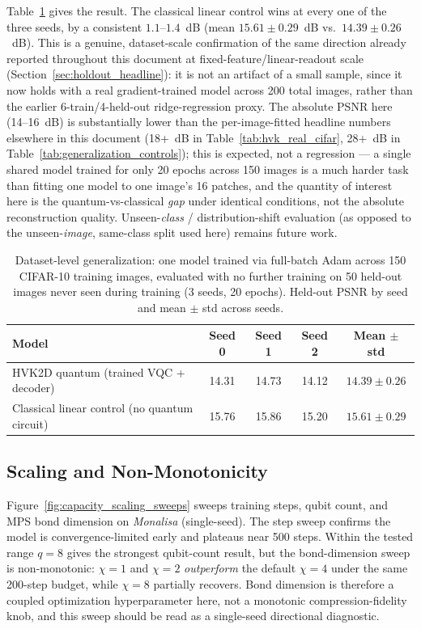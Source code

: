 \documentclass[11pt]{article}
\begin{document}
Table~\ref{tab:dataset_level_generalization} gives the result. The classical linear control wins at every one of the three seeds, by a consistent $1.1$--$1.4$~dB (mean $15.61\pm0.29$~dB vs.\ $14.39\pm0.26$~dB). This is a genuine, dataset-scale confirmation of the same direction already reported throughout this document at fixed-feature/linear-readout scale (Section~\ref{sec:holdout_headline}): it is not an artifact of a small sample, since it now holds with a real gradient-trained model across 200 total images, rather than the earlier 6-train/4-held-out ridge-regression proxy. The absolute PSNR here (14--16~dB) is substantially lower than the per-image-fitted headline numbers elsewhere in this document (18+~dB in Table~\ref{tab:hvk_real_cifar}, 28+~dB in Table~\ref{tab:generalization_controls}); this is expected, not a regression --- a single shared model trained for only 20 epochs across 150 images is a much harder task than fitting one model to one image's 16 patches, and the quantity of interest here is the quantum-vs-classical \emph{gap} under identical conditions, not the absolute reconstruction quality. Unseen-\emph{class} / distribution-shift evaluation (as opposed to the unseen-\emph{image}, same-class split used here) remains future work.

\begin{table}[H]
\centering
\caption{Dataset-level generalization: one model trained via full-batch Adam across 150 CIFAR-10 training images, evaluated with no further training on 50 held-out images never seen during training (3 seeds, 20 epochs). Held-out PSNR by seed and mean $\pm$ std across seeds.}
\label{tab:dataset_level_generalization}
\scriptsize
\begin{tabular}{lcccc}
\toprule
Model & Seed 0 & Seed 1 & Seed 2 & Mean $\pm$ std \\
\midrule
HVK2D quantum (trained VQC + decoder) & 14.31 & 14.73 & 14.12 & $14.39\pm0.26$ \\
Classical linear control (no quantum circuit) & 15.76 & 15.86 & 15.20 & $15.61\pm0.29$ \\
\bottomrule
\end{tabular}
\end{table}

\subsection{Scaling and Non-Monotonicity}
Figure~\ref{fig:capacity_scaling_sweeps} sweeps training steps, qubit count, and MPS bond dimension on \textit{Monalisa} (single-seed). The step sweep confirms the model is convergence-limited early and plateaus near 500 steps. Within the tested range $q=8$ gives the strongest qubit-count result, but the bond-dimension sweep is non-monotonic: $\chi=1$ and $\chi=2$ \emph{outperform} the default $\chi=4$ under the same 200-step budget, while $\chi=8$ partially recovers. Bond dimension is therefore a coupled optimization hyperparameter here, not a monotonic compression-fidelity knob, and this sweep should be read as a single-seed directional diagnostic.
\end{document}
